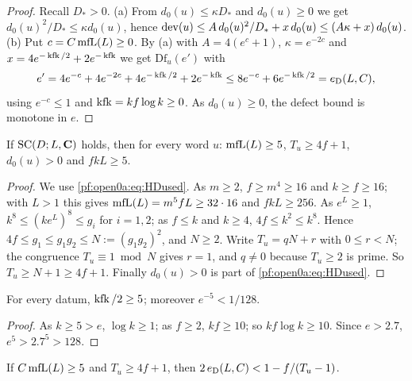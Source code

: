 \begin{proof}
Recall $D_*>0$. (a) From $d_0(u)\le\kappa D_*$ and $d_0(u)\ge0$ we get $d_0(u)^2/D_*\le\kappa d_0(u)$, hence
$\operatorname{dev}(u)\le A\,d_0(u)^2/D_*+x\,d_0(u)\le(A\kappa+x)\,d_0(u)$.
(b) Put $c=C\operatorname{mfL}(L)\ge0$. By (a) with $A=4(e^c+1)$, $\kappa=e^{-2c}$ and
$x=4e^{-\operatorname{kfk}/2}+2e^{-\operatorname{kfk}}$ we get $\mathrm{Df}_u(e')$ with
\[
e'=4e^{-c}+4e^{-2c}+4e^{-\operatorname{kfk}/2}+2e^{-\operatorname{kfk}}\le8e^{-c}+6e^{-\operatorname{kfk}/2}=e_{\mathrm{D}}(L,C),
\]
using $e^{-c}\le1$ and $\operatorname{kfk}=kf\log k\ge0$. As $d_0(u)\ge0$, the defect bound is monotone in $e$.
\end{proof}

\begin{lemma}\label{pf:open0a:hdnum}
If $\mathrm{SC}(D;L,\mathbf C)$ holds, then for every word $u$: $\operatorname{mfL}(L)\ge5$, $T_u\ge4f+1$, $d_0(u)>0$ and
$fkL\ge5$.
\end{lemma}

\begin{proof}
We use \eqref{pf:open0a:eq:HDused}. As $m\ge2$, $f\ge m^4\ge16$ and $k\ge f\ge16$; with $L>1$ this gives
$\operatorname{mfL}(L)=m^5fL\ge32\cdot16$ and $fkL\ge256$. As $e^L\ge1$, $k^8\le(ke^L)^8\le g_i$ for $i=1,2$; as $f\le k$
and $k\ge4$, $4f\le k^2\le k^8$. Hence $4f\le g_1\le g_1g_2\le N:=(g_1g_2)^2$, and $N\ge2$. Write $T_u=qN+r$ with
$0\le r<N$; the congruence $T_u\equiv1\bmod N$ gives $r=1$, and $q\ne0$ because $T_u\ge2$ is prime. So
$T_u\ge N+1\ge4f+1$. Finally $d_0(u)>0$ is part of \eqref{pf:open0a:eq:HDused}.
\end{proof}

\begin{lemma}\label{pf:open0a:small}
For every datum, $\operatorname{kfk}/2\ge5$; moreover $e^{-5}<1/128$.
\ 
\end{lemma}

\begin{proof}
As $k\ge5>e$, $\log k\ge1$; as $f\ge2$, $kf\ge10$; so $kf\log k\ge10$. Since $e>2.7$, $e^5>2.7^5>128$.
\end{proof}

\begin{lemma}\label{pf:open0a:twoe}
If $C\operatorname{mfL}(L)\ge5$ and $T_u\ge4f+1$, then $2\,e_{\mathrm{D}}(L,C)<1-f/(T_u-1)$.
\end{lemma}

